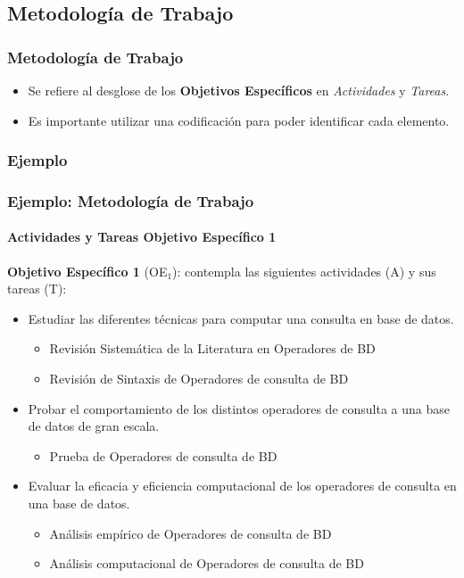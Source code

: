 \documentclass[aspectratio=169]{beamer}%
\newcommand\azul[1]{\textcolor[RGB]{0,91,187}{#1}}
\begin{document}
\subsection{Metodología de Trabajo}
\begin{frame}[fragile]
\frametitle{\textbf{Metodología de Trabajo}}
\justifying
\begin{itemize}
 \item Se refiere al desglose de los \textbf{Objetivos Específicos} en \textit{Actividades} y \textit{Tareas}.
 \item Es importante utilizar una codificación para poder identificar cada elemento.
\end{itemize}
\end{frame}
\subsubsection{Ejemplo}
\begin{frame}[fragile]
\frametitle{\textbf{Ejemplo: Metodología de Trabajo}}
\framesubtitle{Actividades y Tareas Objetivo Específico 1}
\justifying
\textbf{Objetivo Específico 1} (\azul{OE$_1$}): contempla las siguientes actividades (\azul{A}) y sus tareas (\azul{T}):

\begin{itemize}
 \item [A$_1$] Estudiar las diferentes técnicas para computar una consulta en base de datos.
 \begin{itemize}
  \item [T$_1$] Revisión Sistemática de la Literatura en Operadores de BD
\item [T$_2$] Revisión de Sintaxis de Operadores de consulta de BD
 \end{itemize}
\item [A$_2$] Probar el comportamiento de los distintos operadores de consulta a una base de datos de gran escala.
\begin{itemize}
\item [T$_1$] Prueba de Operadores de consulta de BD
\end{itemize}
\item [A$_3$] Evaluar la eficacia y eficiencia computacional de los operadores de consulta en una base de datos.
\begin{itemize}
 \item [T$_1$]Análisis empírico de Operadores de consulta de BD
\item [T$_2$] Análisis computacional de Operadores de consulta de BD
\end{itemize}




\end{itemize}
\end{frame}
\end{document}
